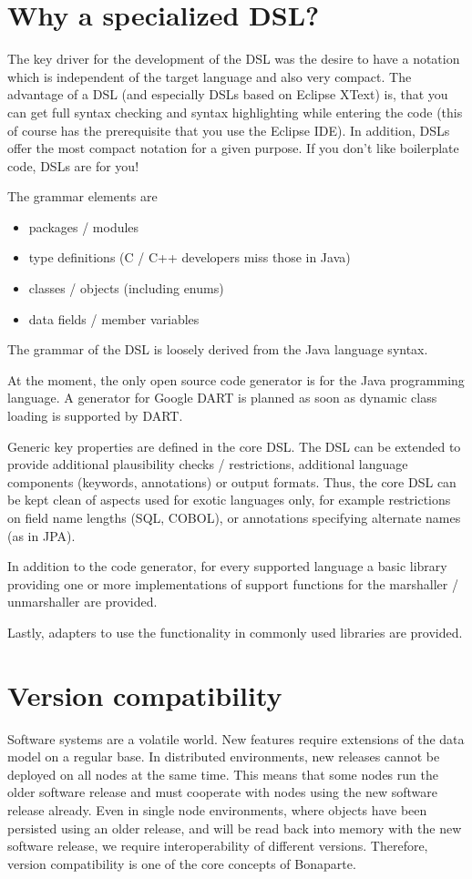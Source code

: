 \documentclass[11pt,a4paper,oneside]{article}
\begin{document}
\section{Why a specialized DSL?}
The key driver for the development of the DSL was the desire to have a notation which is independent of the target language and also very compact.
The advantage of a DSL (and especially DSLs based on Eclipse XText) is, that you can get full syntax checking and syntax highlighting while entering the code
(this of course has the prerequisite that you use the Eclipse IDE). In addition, DSLs offer the most compact notation for a given purpose. If you don't like boilerplate code, DSLs are for you!

The grammar elements are
\begin{itemize}
  \item packages / modules
  \item type definitions (C / C++ developers miss those in Java)
  \item classes / objects (including enums)
  \item data fields / member variables
\end{itemize}
The grammar of the DSL is loosely derived from the Java language syntax.

At the moment, the only open source code generator is for the Java programming language. A generator for Google DART is planned as soon as dynamic class loading is supported by DART.

Generic key properties are defined in the core DSL. The DSL can be extended to
provide additional plausibility checks / restrictions, additional language components
(keywords, annotations) or output formats. Thus, the core DSL can be kept clean
of aspects used for exotic languages only, for example restrictions on field
name lengths (SQL, COBOL), or annotations specifying alternate names (as in
JPA).

In addition to the code generator, for every supported language a basic library providing one or more
implementations of support functions for the marshaller / unmarshaller are provided.

Lastly, adapters to use the functionality in commonly used libraries are
provided.


\section{Version compatibility}
Software systems are a volatile world. New features require extensions of the
data model on a regular base. In distributed environments, new releases
cannot be deployed on all nodes at the same time. This means that some nodes run
the older software release and must cooperate with nodes using the new software
release already. Even in single node environments, where objects have been
persisted using an older release, and will be read back into memory with the new
software release, we require interoperability of different versions.
Therefore, version compatibility is one of the core concepts of Bonaparte.
\end{document}
